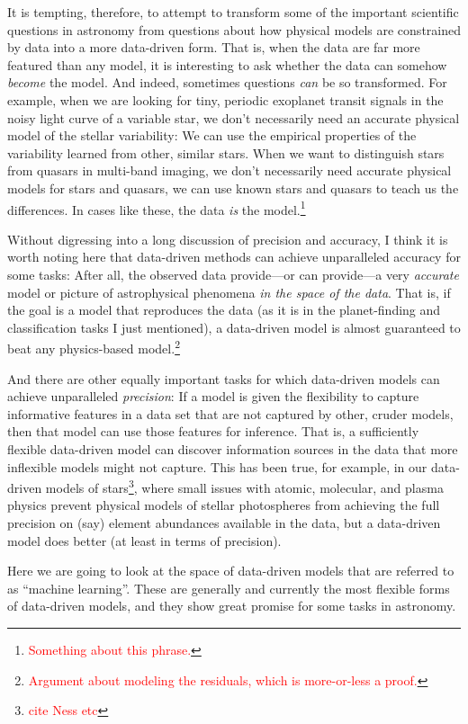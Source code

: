 \documentclass[12pt, twoside, letterpaper]{article}
\newcommand{\todo}[1]{\textcolor{red}{#1}}  %
\begin{document}
It is tempting, therefore, to attempt to transform some of the important
scientific questions in astronomy from questions about how physical models are
constrained by data into a more data-driven form.
That is, when the data are far more featured than any model, it is interesting
to ask whether the data can somehow \emph{become} the model.
And indeed, sometimes questions \emph{can} be so transformed.
For example, when we are looking for tiny, periodic exoplanet transit
signals in the noisy light curve of a variable star, we don't necessarily
need an accurate physical model of the stellar variability:
We can use the empirical properties of the variability learned from
other, similar stars.
When we want to distinguish stars from quasars in multi-band imaging, we
don't necessarily need accurate physical models for stars and quasars,
we can use known stars and quasars to teach us the differences.
In cases like these, the data \emph{is} the model.\footnote{\todo{Something about this phrase.}}

Without digressing into a long discussion of precision and accuracy, I
think it is worth noting here that data-driven methods can achieve
unparalleled accuracy for some tasks:
After all, the observed data provide---or can provide---a very
\emph{accurate} model or picture of astrophysical phenomena \emph{in
  the space of the data}.
That is, if the goal is a model that reproduces the data (as it is in
the planet-finding and classification tasks I just mentioned), a
data-driven model is almost guaranteed to beat any physics-based
model.\footnote{\todo{Argument about modeling the residuals, which is
    more-or-less a proof.}}

And there are other equally important tasks for which data-driven
models can achieve unparalleled \emph{precision}:
If a model is given the flexibility to capture informative features
in a data set that are not captured by other, cruder models, then that
model can use those features for inference.
That is, a sufficiently flexible data-driven model can discover information
sources in the data that more inflexible models might not capture.
This has been true, for example, in our data-driven models of stars\footnote{\todo{cite Ness etc}},
where small issues with atomic, molecular, and plasma physics prevent
physical models of stellar photospheres from achieving the full precision
on (say) element abundances available in the data, but a data-driven
model does better (at least in terms of precision).

Here we are going to look at the space of data-driven models that are
referred to as ``machine learning''.
These are generally and currently the most flexible forms of data-driven
models, and they show great promise for some tasks in astronomy.
\end{document}
